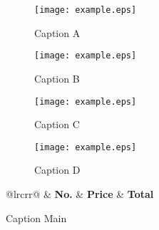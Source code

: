 \begin{figure}[ht]  \centering
        \hspace{-20pt}
        \begin{minipage}{0.64\textwidth} \centering
            \begin{subfigure}[b]{0.5\linewidth}
                \centering
                \texttt{[image: example.eps]} 
                \small\caption{Caption A} 
                \label{fig:fig6} 
                \vspace{4ex}
            \end{subfigure}%
            \begin{subfigure}[b]{0.5\linewidth}
                \centering
                \texttt{[image: example.eps]} 
                \small\caption{Caption B} 
                \label{fig:fig7} 
                \vspace{4ex}
            \end{subfigure}
            \vspace{10pt}
            \begin{subfigure}[b]{0.5\linewidth}
                \centering
                \texttt{[image: example.eps]} 
                \small\caption{Caption C} 
                \label{fig:fig8} 
            \end{subfigure}%
            \begin{subfigure}[b]{0.5\linewidth}
                \centering
                \texttt{[image: example.eps]} 
                \small\caption{Caption D} 
                \label{fig:fig9} 
            \end{subfigure}
            \small\caption{Caption Main}
            \label{fig:fig_all}
        \end{minipage}
        \hspace{2.5pt}
        \begin{minipage}{0.3\textwidth}
            \renewcommand\tabcolsep{2pt} %
            \def\arraystretch{1.15}%
       		\centering
            \vspace{-15pt}
            \label{tab:table2}
            \small{}
            \footnotesize{%
            \begin{tabular}{@{}lrcrr@{}}\toprule
                 & \textbf{No.} 	& \textbf{Price}	& \textbf{Total} \\ \midrule 

\end{tabular}}
\end{minipage}
\end{figure}
